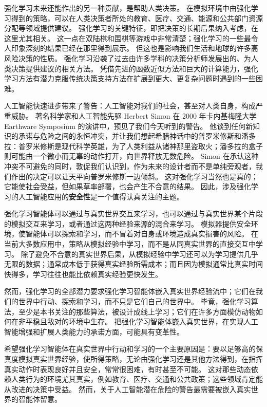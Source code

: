 \documentclass[UTF8,12pt,a4paper,fontset=fandol]{ctexart}
\begin{document}
强化学习未来还能作出的另一种贡献，是帮助人类决策。
在模拟环境中由强化学习得到的策略，可以在人类决策者所处的教育、医疗、交通、能源和公共部门资源分配等领域提供建议。
强化学习的关键特征，即把决策的长期后果纳入考虑，在这里尤其相关。
这一点在双陆棋和围棋等游戏中非常清楚；强化学习的一些最令人印象深刻的结果已经在那里得到展示。
但这也是影响我们生活和地球的许多高风险决策的性质。
强化学习沿袭了过去由许多学科的决策分析师发展出的、为人类决策提供建议的相关方法。
凭借先进的函数近似方法和巨大的计算能力，强化学习方法有潜力克服传统决策支持方法在扩展到更大、更复杂问题时遇到的一些困难。

人工智能快速进步带来了警告：人工智能对我们的社会，甚至对人类自身，构成严重威胁。
著名科学家和人工智能先驱 Herbert Simon 在 2000 年卡内基梅隆大学 Earthware Symposium 的演讲中，预见了我们今天听到的警告。
他谈到任何新知识的承诺与危险之间的永恒冲突，并让我们想起希腊神话中的普罗米修斯和潘多拉：普罗米修斯是现代科学英雄，为了人类利益从诸神那里盗取火；潘多拉的盒子则可能由一个微小而无辜的动作打开，向世界释放无数危险。
Simon 在承认这种冲突不可避免的同时，敦促我们认识到，作为未来的设计者而不是单纯旁观者，我们作出的决定可以让天平向普罗米修斯一边倾斜。
这对强化学习当然也是真的；它能使社会受益，但如果草率部署，也会产生不合意的结果。
因此，涉及强化学习的人工智能应用的\textbf{安全性}是一个值得认真关注的主题。

强化学习智能体可以通过与真实世界交互来学习，也可以通过与真实世界某个片段的模拟交互来学习，或者通过这两种经验来源的混合来学习。
模拟器提供安全环境，使智能体可以探索和学习，而不冒着对自身或环境造成真实损害的风险。
在当前大多数应用中，策略从模拟经验中学习，而不是从同真实世界的直接交互中学习。
除了避免不合意的真实世界后果，从模拟经验中学习还可以为学习提供几乎无限的数据；通常成本低于获得真实经验所需成本；而且因为模拟通常比真实时间快得多，学习往往也能比依赖真实经验更快发生。

然而，强化学习的全部潜力要求强化学习智能体嵌入真实世界经验流中；它们在我们的世界中行动、探索和学习，而不只是它们自己的世界中。
毕竟，强化学习算法，至少是本书关注的那些算法，被设计成线上学习；它们在许多方面模仿动物如何在非平稳且敌对的环境中生存。
把强化学习智能体嵌入真实世界，在实现人工智能增强和扩展人类能力的承诺方面，可能具有变革性。

希望强化学习智能体在真实世界中行动和学习的一个主要原因是：要以足够高的保真度模拟真实世界经验，使所得策略，无论由强化学习还是其他方法得到，在指挥真实动作时表现良好并且安全，常常很困难，有时甚至不可能。
这对那些动态依赖人类行为的环境尤其真实，例如教育、医疗、交通和公共政策；这些领域肯定能从改进的决策中受益。
然而，关于人工智能潜在危险的警告最需要被嵌入真实世界的智能体留意。
\end{document}
